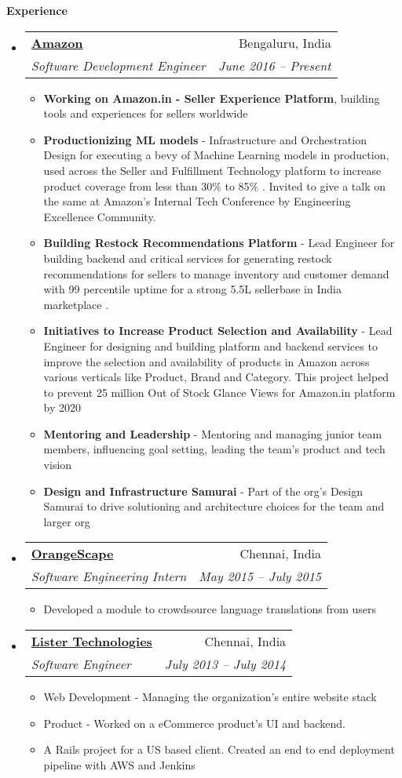 \documentclass[letterpaper,11pt]{article}
\makeatletter
\newcommand{\resitem}[1]{\item #1 \vspace{-2pt}}
\newcommand{\resheading}[1]{{\large \colorbox{mygrey}{\begin{minipage}{\textwidth}{\textbf{#1 \vphantom{p\^{E}}}}\end{minipage}}}}
\newcommand{\ressubheading}[4]{
\begin{tabular*}{6.5in}{l@{\extracolsep{\fill}}r}
		\textbf{#1} & #2 \\
		\textit{#3} & \textit{#4} \\
\end{tabular*}\vspace{-6pt}}
\makeatother
\begin{document}
\resheading{Experience}
	\begin{itemize}
	    \item 
			\ressubheading{\href{http://www.amazon.in/}{Amazon}}{Bengaluru, India}
				{Software Development Engineer}{June 2016 -- Present}
				{ \footnotesize
				\begin{itemize}
					\resitem{\textbf{Working on Amazon.in  - Seller Experience Platform}, building tools and experiences for sellers worldwide}
					\resitem{\textbf{Productionizing ML models} - Infrastructure and Orchestration Design for executing a bevy of Machine Learning models in production, used across the Seller and Fulfillment Technology platform to increase product coverage from less than 30\% to 85\%}. Invited to give a talk on the same at Amazon's Internal Tech Conference by Engineering Excellence Community.
					\resitem{\textbf{Building Restock Recommendations Platform} - Lead Engineer for building backend and critical services for generating restock recommendations for sellers to manage inventory and customer demand with 99 percentile uptime for a strong 5.5L sellerbase in India marketplace}.
					\resitem{\textbf{Initiatives to Increase Product Selection and Availability} - Lead Engineer for designing and building platform and backend services to improve the selection and availability of products in Amazon across various verticals like Product, Brand and Category. This project helped to prevent 25 million Out of Stock Glance Views for Amazon.in platform by 2020}
					\resitem{\textbf{Mentoring and Leadership} - Mentoring and managing junior team members, influencing goal setting, leading the team's product and tech vision}
					\resitem{\textbf{Design and Infrastructure Samurai} - Part of the org's Design Samurai to drive solutioning and architecture choices for the team and larger org}
				\end{itemize}
				}
		\item 
			\ressubheading{\href{http://www.orangescape.com/}{OrangeScape}}{Chennai, India}
				{Software Engineering Intern}{May 2015 -- July 2015}
				{ \footnotesize
				\begin{itemize}
					\resitem{Developed a module to crowdsource language translations from users}
				\end{itemize}
				}
		\item 
			\ressubheading{\href{http://www.listertechnologies.com/}{Lister Technologies}}{Chennai, India}
				{Software Engineer}{July 2013 -- July 2014}
				{ \footnotesize
				\begin{itemize}
					\resitem{Web Development - Managing the organization's entire website stack}
					\resitem{Product - Worked on a eCommerce product's UI and backend.}
					\resitem{A Rails project for a US based client. Created an end to end deployment pipeline with AWS and Jenkins}
				\end{itemize}
				}
	\end{itemize}  %
\end{document}
